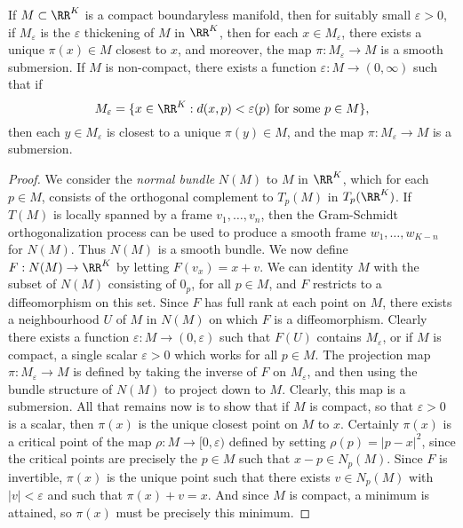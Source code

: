 \begin{lemma}
    If $M \subset \RR^K$ is a compact boundaryless manifold, then for suitably small $\varepsilon > 0$, if $M_\varepsilon$ is the $\varepsilon$ thickening of $M$ in $\RR^K$, then for each $x \in M_\varepsilon$, there exists a unique $\pi(x) \in M$ closest to $x$, and moreover, the map $\pi: M_\varepsilon \to M$ is a smooth submersion. If $M$ is non-compact, there exists a function $\varepsilon: M \to (0,\infty)$ such that if
    \[ M_\varepsilon = \{ x \in \RR^K: d(x,p) < \varepsilon(p)\ \text{for some $p \in M$} \}, \]
    then each $y \in M_\varepsilon$ is closest to a unique $\pi(y) \in M$, and the map $\pi: M_\varepsilon \to M$ is a submersion.
\end{lemma}
\begin{proof}
    We consider the \emph{normal bundle} $N(M)$ to $M$ in $\RR^K$, which for each $p \in M$, consists of the orthogonal complement to $T_p(M)$ in $T_p(\RR^K)$. If $T(M)$ is locally spanned by a frame $v_1, \dots, v_n$, then the Gram-Schmidt orthogonalization process can be used to produce a smooth frame $w_1, \dots, w_{K-n}$ for $N(M)$. Thus $N(M)$ is a smooth bundle. We now define $F: N(M) \to \RR^K$ by letting $F(v_x) = x + v$. We can identity $M$ with the subset of $N(M)$ consisting of $0_p$, for all $p \in M$, and $F$ restricts to a diffeomorphism on this set. Since $F$ has full rank at each point on $M$, there exists a neighbourhood $U$ of $M$ in $N(M)$ on which $F$ is a diffeomorphism. Clearly there exists a function $\varepsilon: M \to (0,\varepsilon)$ such that $F(U)$ contains $M_\varepsilon$, or if $M$ is compact, a single scalar $\varepsilon > 0$ which works for all $p \in M$. The projection map $\pi: M_\varepsilon \to M$ is defined by taking the inverse of $F$ on $M_\varepsilon$, and then using the bundle structure of $N(M)$ to project down to $M$. Clearly, this map is a submersion. All that remains now is to show that if $M$ is compact, so that $\varepsilon > 0$ is a scalar, then $\pi(x)$ is the unique closest point on $M$ to $x$. Certainly $\pi(x)$ is a critical point of the map $\rho: M \to [0,\varepsilon)$ defined by setting $\rho(p) = |p - x|^2$, since the critical points are precisely the $p \in M$ such that $x - p \in N_p(M)$. Since $F$ is invertible, $\pi(x)$ is the unique point such that there exists $v \in N_p(M)$ with $|v| < \varepsilon$ and such that $\pi(x) + v = x$. And since $M$ is compact, a minimum is attained, so $\pi(x)$ must be precisely this minimum.
\end{proof}

